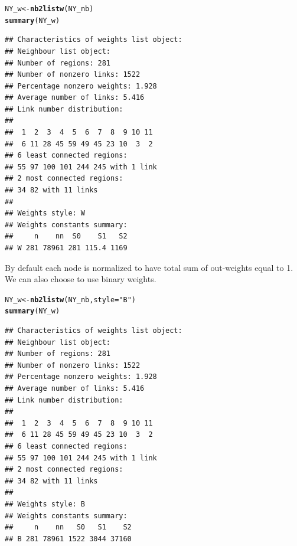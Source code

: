 \documentclass{article}\usepackage[]{graphicx}\usepackage[]{color}
\makeatletter
\newcommand{\hlstr}[1]{\textcolor[rgb]{0.192,0.494,0.8}{#1}}%
\newcommand{\hlstd}[1]{\textcolor[rgb]{0.345,0.345,0.345}{#1}}%
\newcommand{\hlkwb}[1]{\textcolor[rgb]{0.69,0.353,0.396}{#1}}%
\newcommand{\hlkwc}[1]{\textcolor[rgb]{0.333,0.667,0.333}{#1}}%
\newcommand{\hlkwd}[1]{\textcolor[rgb]{0.737,0.353,0.396}{\textbf{#1}}}%
\newenvironment{kframe}{%
 \def\at@end@of@kframe{}%
 \ifinner\ifhmode%
  \def\at@end@of@kframe{\end{minipage}}%
  \begin{minipage}{\columnwidth}%
 \fi\fi%
 \def\FrameCommand##1{\hskip\@totalleftmargin \hskip-\fboxsep
 \colorbox{shadecolor}{##1}\hskip-\fboxsep
     \hskip-\linewidth \hskip-\@totalleftmargin \hskip\columnwidth}%
 \MakeFramed {\advance\hsize-\width
   \@totalleftmargin\z@ \linewidth\hsize
   \@setminipage}}%
 {\par\unskip\endMakeFramed%
 \at@end@of@kframe}
\newenvironment{knitrout}{}{} %
\makeatother
\begin{document}
\begin{knitrout}
\color{fgcolor}\begin{kframe}
\begin{alltt}
\hlstd{NY_w} \hlkwb{<-}\hlkwd{nb2listw}\hlstd{(NY_nb)}
\hlkwd{summary}\hlstd{(NY_w)}
\end{alltt}
\begin{verbatim}
## Characteristics of weights list object:
## Neighbour list object:
## Number of regions: 281 
## Number of nonzero links: 1522 
## Percentage nonzero weights: 1.928 
## Average number of links: 5.416 
## Link number distribution:
## 
##  1  2  3  4  5  6  7  8  9 10 11 
##  6 11 28 45 59 49 45 23 10  3  2 
## 6 least connected regions:
## 55 97 100 101 244 245 with 1 link
## 2 most connected regions:
## 34 82 with 11 links
## 
## Weights style: W 
## Weights constants summary:
##     n    nn  S0    S1   S2
## W 281 78961 281 115.4 1169
\end{verbatim}
\end{kframe}
\end{knitrout}

By default each node is normalized to have total sum of out-weights equal to 1. We can also choose to use binary weights.

\begin{knitrout}
\color{fgcolor}\begin{kframe}
\begin{alltt}
\hlstd{NY_w} \hlkwb{<-}\hlkwd{nb2listw}\hlstd{(NY_nb,} \hlkwc{style} \hlstd{=} \hlstr{"B"}\hlstd{)}
\hlkwd{summary}\hlstd{(NY_w)}
\end{alltt}
\begin{verbatim}
## Characteristics of weights list object:
## Neighbour list object:
## Number of regions: 281 
## Number of nonzero links: 1522 
## Percentage nonzero weights: 1.928 
## Average number of links: 5.416 
## Link number distribution:
## 
##  1  2  3  4  5  6  7  8  9 10 11 
##  6 11 28 45 59 49 45 23 10  3  2 
## 6 least connected regions:
## 55 97 100 101 244 245 with 1 link
## 2 most connected regions:
## 34 82 with 11 links
## 
## Weights style: B 
## Weights constants summary:
##     n    nn   S0   S1    S2
## B 281 78961 1522 3044 37160
\end{verbatim}
\end{kframe}
\end{knitrout}
\end{document}
